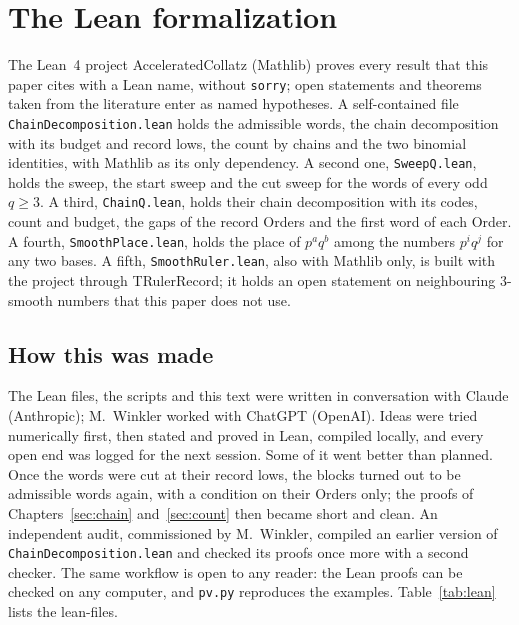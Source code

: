 \documentclass[10pt,a4paper,titlepage]{article}
\newcommand{\lean}[1]{\textsf{#1}}
\begin{document}
\appendix

\section{The Lean formalization}
\label{app:lean}

The Lean~4 project \lean{AcceleratedCollatz} (Mathlib) proves every result
that this paper cites with a Lean name, without \texttt{sorry}; open statements and
theorems taken from the literature enter as named hypotheses. A self-contained file
\texttt{ChainDecomposition.lean} holds the admissible words, the chain
decomposition with its budget and record lows, the count by chains and the two
binomial identities, with Mathlib as its only dependency. A second one,
\texttt{SweepQ.lean}, holds the sweep, the start sweep and the cut sweep for the
words of every odd $q \ge 3$. A third, \texttt{ChainQ.lean}, holds their chain
decomposition with its codes, count and budget, the gaps of the record Orders and the
first word of each Order. A fourth, \texttt{SmoothPlace.lean}, holds the place of
$p^a q^b$ among the numbers $p^i q^j$ for any two bases. A fifth,
\texttt{SmoothRuler.lean}, also with Mathlib only, is built with the project through
\lean{TRulerRecord}; it holds an open statement on neighbouring $3$-smooth numbers that
this paper does not use.

\subsection*{How this was made}

The Lean files, the scripts and this text were written in conversation with
Claude (Anthropic); M.~Winkler worked with ChatGPT (OpenAI). Ideas were tried numerically first, then stated and proved in
Lean, compiled locally, and every open end was logged for the next session. Some
of it went better than planned. Once the words were cut at their record lows, the
blocks turned out to be admissible words again, with a condition on their Orders
only; the proofs of Chapters~\ref{sec:chain} and~\ref{sec:count} then became short
and clean. An independent audit, commissioned by M.~Winkler, compiled an earlier
version of \texttt{ChainDecomposition.lean} and checked its proofs once more with a second
checker. The same workflow is open to any reader:
the Lean proofs can be checked on any computer, and \texttt{pv.py} reproduces the
examples. Table~\ref{tab:lean} lists the lean-files.
\end{document}
